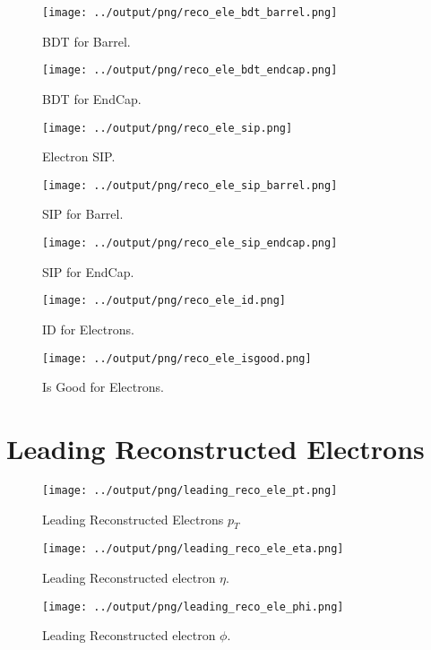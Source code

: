 \documentclass[11pt]{book}
\begin{document}
\begin{figure}[htb]
\centering
\texttt{[image: ../output/png/reco\_ele\_bdt\_barrel.png]}
\caption{BDT for Barrel.}
\label{fig:reco_ele_bdt_barrel}
\end{figure}

\begin{figure}[htb]
\centering
\texttt{[image: ../output/png/reco\_ele\_bdt\_endcap.png]}
\caption{BDT for EndCap.}
\label{fig:reco_ele_bdt_endcap}
\end{figure}

\begin{figure}[htb]
\centering
\texttt{[image: ../output/png/reco\_ele\_sip.png]}
\caption{Electron SIP.}
\label{fig:reco_ele_sip}
\end{figure}

\begin{figure}[htb]
\centering
\texttt{[image: ../output/png/reco\_ele\_sip\_barrel.png]}
\caption{SIP for Barrel.}
\label{fig:reco_ele_sip_barrel}
\end{figure}

\begin{figure}[htb]
\centering
\texttt{[image: ../output/png/reco\_ele\_sip\_endcap.png]}
\caption{SIP for EndCap.}
\label{fig:reco_ele_sip_endcap}
\end{figure}

\begin{figure}[htb]
\centering
\texttt{[image: ../output/png/reco\_ele\_id.png]}
\caption{ID for Electrons.}
\label{fig:reco_ele_id}
\end{figure}

\begin{figure}[htb]
\centering
\texttt{[image: ../output/png/reco\_ele\_isgood.png]}
\caption{Is Good for Electrons.}
\label{fig:reco_ele_isgood}
\end{figure}
\clearpage

\section{Leading Reconstructed Electrons}
\begin{figure}[ht]
\centering
\texttt{[image: ../output/png/leading\_reco\_ele\_pt.png]}
\caption{Leading Reconstructed Electrons $p_{T}$}
\label{fig:leading_reco_ele_pt}
\end{figure}

\begin{figure}[ht]
\centering
\texttt{[image: ../output/png/leading\_reco\_ele\_eta.png]}
\caption{Leading Reconstructed electron $\eta$.}
\label{fig:leading_reco_ele_eta}
\end{figure}

\begin{figure}[ht]
\centering
\texttt{[image: ../output/png/leading\_reco\_ele\_phi.png]}
\caption{Leading Reconstructed electron $\phi$.}
\label{fig:leading_reco_ele_phi}
\end{figure}
\clearpage

\end{document}
